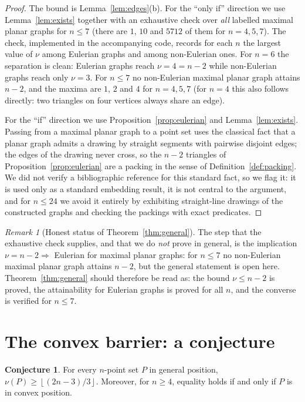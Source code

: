 \documentclass[11pt]{article}
\theoremstyle{plain}
\theoremstyle{definition}
\newtheorem{conjecture}[theorem]{Conjecture}
\theoremstyle{remark}
\newtheorem{remark}[theorem]{Remark}
\newcommand{\Floor}[1]{\left\lfloor #1\right\rfloor}
\begin{document}
\begin{proof}
The bound is Lemma~\ref{lem:edges}(b).  For the ``only if'' direction we use
Lemma~\ref{lem:exists} together with an exhaustive check over \emph{all} labelled maximal
planar graphs for $n\le 7$ (there are $1$, $10$ and $5712$ of them for $n=4,5,7$).  The
check, implemented in the accompanying code, records for each $n$ the largest value of
$\nu$ among Eulerian graphs and among non-Eulerian ones.  For $n=6$ the separation is
clean: Eulerian graphs reach $\nu=4=n-2$ while non-Eulerian graphs reach only $\nu=3$.
For $n\le 7$ no non-Eulerian maximal planar graph attains $n-2$, and the maxima are $1$,
$2$ and $4$ for $n=4,5,7$ (for $n=4$ this also follows directly: two triangles on four
vertices always share an edge).

For the ``if'' direction we use Proposition~\ref{prop:eulerian} and
Lemma~\ref{lem:exists}.  Passing from a maximal planar graph to a point set uses the
classical fact that a planar graph admits a drawing by straight segments with pairwise
disjoint edges; the edges of the drawing never cross, so the $n-2$ triangles of
Proposition~\ref{prop:eulerian} are a packing in the sense of
Definition~\ref{def:packing}.  We did not verify a bibliographic reference for this
standard fact, so we flag it: it is used only as a standard embedding result, it is not
central to the argument, and for $n\le 24$ we avoid it entirely by exhibiting straight-line
drawings of the constructed graphs and checking the packings with exact predicates.
\end{proof}

\begin{remark}[Honest status of Theorem~\ref{thm:general}]\label{rem:honest}
The step that the exhaustive check supplies, and that we do \emph{not} prove in general, is
the implication $\nu=n-2\Rightarrow$ Eulerian for maximal planar graphs: for $n\le 7$ no
non-Eulerian maximal planar graph attains $n-2$, but the general statement is open here.
Theorem~\ref{thm:general} should therefore be read as: the bound $\nu\le n-2$ is proved, the
attainability for Eulerian graphs is proved for all $n$, and the converse is verified for
$n\le 7$.
\end{remark}

\section{The convex barrier: a conjecture}

\begin{conjecture}\label{conj:barrier}
For every $n$-point set $P$ in general position,
$\nu(P)\ge\Floor{(2n-3)/3}$.  Moreover, for $n\ge 4$, equality holds if and only if $P$ is
in convex position.
\end{conjecture}
\end{document}
